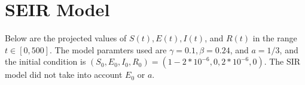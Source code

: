 \documentclass{article}
\begin{document}
\section{SEIR Model}

Below are the projected values of $S(t), E(t), I(t)$, and $R(t)$ in the range $t \in [0, 500]$. The model paramters used are $\gamma = 0.1, \beta=0.24$, and $a=1/3$, and the initial condition is $(S_0, E_0, I_0, R_0) = (1-2*10^{-6}, 0, 2*10^{-6}, 0)$. The SIR model did not take into account $E_0$ or $a$.
\begin{figure}[H]
	\centering
\end{figure}
\end{document}
